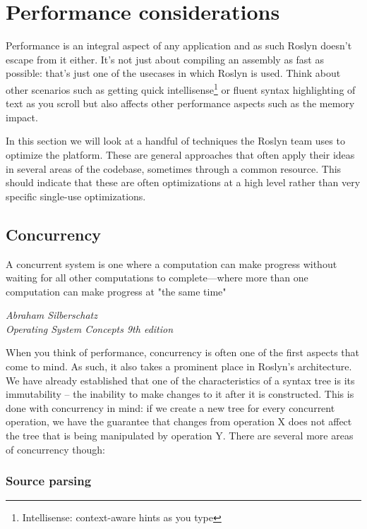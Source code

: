 \section{Performance considerations}
\label{sec:performance}

Performance is an integral aspect of any application and as such Roslyn doesn't escape from it either. It's not just about compiling an assembly as fast as possible: that's just one of the usecases in which Roslyn is used. Think about other scenarios such as getting quick intellisense\footnote{Intellisense: context-aware hints as you type} or fluent syntax highlighting of text as you scroll but also affects other performance aspects such as the memory impact.

In this section we will look at a handful of techniques the Roslyn team uses to optimize the platform. These are general approaches that often apply their ideas in several areas of the codebase, sometimes through a common resource. This should indicate that these are often optimizations at a high level rather than very specific single-use optimizations. 

\subsection{Concurrency}
\label{sec:concurrency}

\epigraph{A concurrent system is one where a computation can make progress without waiting for all other computations to complete—where more than one computation can make progress at "the same time"}{\textit{Abraham Silberschatz \\ \footnotesize{Operating System Concepts 9th edition}}}

When you think of performance, concurrency is often one of the first aspects that come to mind. As such, it also takes a prominent place in Roslyn's architecture. We have already established that one of the characteristics of a syntax tree is its immutability -- the inability to make changes to it after it is constructed. This is done with concurrency in mind: if we create a new tree for every concurrent operation, we have the guarantee that changes from operation X does not affect the tree that is being manipulated by operation Y. There are several more areas of concurrency though:

\subsubsection{Source parsing}
\label{sec:concur-source-parsing}

